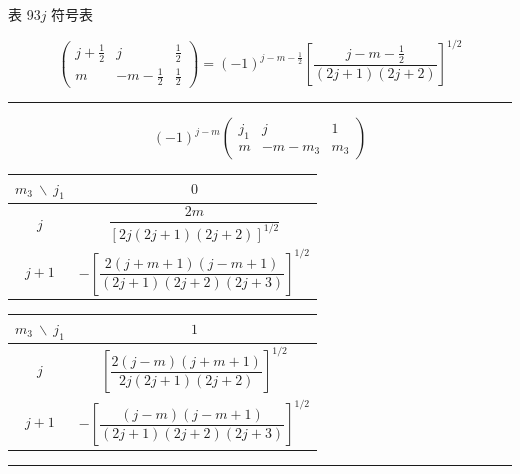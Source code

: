 \begin{center}
{\heiti 表 9}\quad $3j$ 符号表
\end{center}

\begin{equation*}
  \left(\begin{array}{ccc}j+\tfrac12&j&\tfrac12\\[2pt]m&-m-\tfrac12&\tfrac12\end{array}\right)
  =(-1)^{j-m-\frac12}\left[\frac{j-m-\tfrac12}{(2j+1)(2j+2)}\right]^{1/2}
\end{equation*}

\medskip\noindent\rule{\linewidth}{0.5pt}\medskip

\begin{equation*}
  (-1)^{j-m}\left(\begin{array}{ccc}j_1&j&1\\m&-m-m_3&m_3\end{array}\right)
\end{equation*}
\begin{center}
\renewcommand{\arraystretch}{1.7}%
\begin{tabular}{c|c}
  $m_3\ \backslash\ j_1$ & $0$\\ \hline
  $j$ & $\dfrac{2m}{\left[2j(2j+1)(2j+2)\right]^{1/2}}$\\[10pt]
  $j+1$ & $-\left[\dfrac{2(j+m+1)(j-m+1)}{(2j+1)(2j+2)(2j+3)}\right]^{1/2}$\\[10pt]
\end{tabular}

\medskip

\begin{tabular}{c|c}
  $m_3\ \backslash\ j_1$ & $1$\\ \hline
  $j$ & $\left[\dfrac{2(j-m)(j+m+1)}{2j(2j+1)(2j+2)}\right]^{1/2}$\\[10pt]
  $j+1$ & $-\left[\dfrac{(j-m)(j-m+1)}{(2j+1)(2j+2)(2j+3)}\right]^{1/2}$\\[10pt]
\end{tabular}
\end{center}

\medskip\noindent\rule{\linewidth}{0.5pt}\medskip

